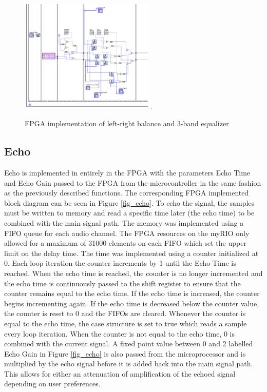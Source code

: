 \begin{figure}[!t]
\centering
\includegraphics[width=2.5in]{balanceandeq.png}
\DeclareGraphicsExtensions.
\caption{FPGA implementation of left-right balance and 3-band equalizer}
\label{fig_BEQ}
\end{figure}  

\subsection{Echo}
Echo is implemented in entirely in the FPGA with the parameters Echo Time and Echo Gain passed to the FPGA from the microcontroller in the same fashion as the previously described functions. 
The corresponding FPGA implemented block diagram can be seen in Figure \ref{fig_echo}.
To echo the signal, the samples must be written to memory and read a specific time later (the echo time) to be combined with the main signal path. 
The memory was implemented using a FIFO queue for each audio channel. The FPGA resources on the myRIO only allowed for a maximum of 31000 elements on each FIFO which set the upper limit on the delay time. 
The time was implemented using a counter initialized at 0. Each loop iteration the counter increments by 1 until the Echo Time is reached. 
When the echo time is reached, the counter is no longer incremented and the echo time is continuously passed to the shift register to ensure that the counter remains equal to the echo time.
If the echo time is increased, the counter begins incrementing again. If the echo time is decreased below the counter value, the counter is reset to 0 and the FIFOs are cleared. 
Whenever the counter is equal to the echo time, the case structure is set to true which reads a sample every loop iteration. 
When the counter is not equal to the echo time, 0 is combined with the current signal. 
A fixed point value between 0 and 2 labelled Echo Gain in Figure \ref{fig_echo} is also passed from the microprocessor and is multiplied by the echo signal before it is added back into the main signal path. 
This allows for either an attenuation of amplification of the echoed signal depending on user preferences.  

